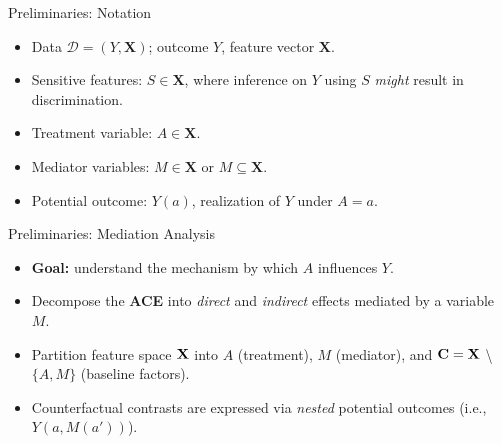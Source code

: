 \documentclass[12pt,t,handout]{beamer}
\newcommand{\D}{\mathcal{D}}
\begin{document}

\begin{frame}[c]{Preliminaries: Notation}

\begin{center}
\begin{itemize}
  \itemsep10pt
  \item Data $\D = (Y, \bm{X})$; outcome $Y$, feature vector $\bm{X}$.
  \item Sensitive features: $S \in \bm{X}$, where inference on $Y$ using $S$
    \textit{might} result in discrimination.
  \item Treatment variable: $A \in \bm{X}$.
  \item Mediator variables: $M \in \bm{X}$ or $M \subseteq \bm{X}$.
  \item Potential outcome: $Y(a)$, realization of $Y$ under $A = a$.
\end{itemize}
\end{center}


\end{frame}


\begin{frame}[c]{Preliminaries: Mediation Analysis}

\begin{center}
\begin{itemize}
  \itemsep10pt
  \item \textbf{Goal:} understand the mechanism by which $A$ influences $Y$.
  \item Decompose the \textbf{ACE} into \textit{direct} and \textit{indirect}
    effects mediated by a variable $M$.
  \item Partition feature space $\bf{X}$ into $A$ (treatment), $M$ (mediator),
    and $\bf{C} = \bf{X}$ \textbackslash \hspace{0.1em} $\{A, M\}$ (baseline
    factors).
  \item Counterfactual contrasts are expressed via \textit{nested} potential
    outcomes (i.e., $Y(a, M(a'))$).
\end{itemize}
\end{center}


\end{frame}
\end{document}
